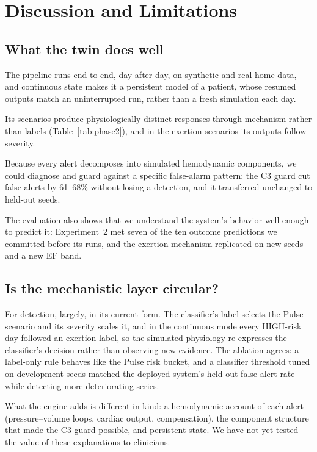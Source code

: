 \documentclass[conference]{IEEEtran}
\begin{document}
\section{Discussion and Limitations}\label{sec:discussion}
\subsection{What the twin does well}
The pipeline runs end to end, day after day, on synthetic and real home data, and continuous state makes it a persistent model of a patient, whose resumed outputs match an uninterrupted run, rather than a fresh simulation each day.

Its scenarios produce physiologically distinct responses through mechanism rather than labels (Table~\ref{tab:phase2}), and in the exertion scenarios its outputs follow severity.

Because every alert decomposes into simulated hemodynamic components, we could diagnose and guard against a specific false-alarm pattern: the C3 guard cut false alerts by 61--68\% without losing a detection, and it transferred unchanged to held-out seeds.

The evaluation also shows that we understand the system's behavior well enough to predict it: Experiment~2 met seven of the ten outcome predictions we committed before its runs, and the exertion mechanism replicated on new seeds and a new EF band.

\subsection{Is the mechanistic layer circular?}
For detection, largely, in its current form. The classifier's label selects the Pulse scenario and its severity scales it, and in the continuous mode every HIGH-risk day followed an exertion label, so the simulated physiology re-expresses the classifier's decision rather than observing new evidence. The ablation agrees: a label-only rule behaves like the Pulse risk bucket, and a classifier threshold tuned on development seeds matched the deployed system's held-out false-alert rate while detecting more deteriorating series.

What the engine adds is different in kind: a hemodynamic account of each alert (pressure--volume loops, cardiac output, compensation), the component structure that made the C3 guard possible, and persistent state. We have not yet tested the value of these explanations to clinicians.
\end{document}
